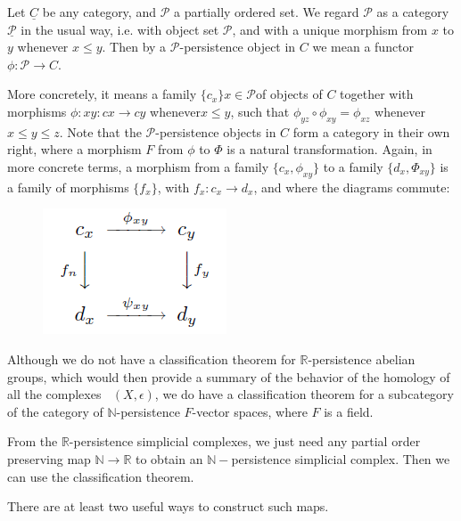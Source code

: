 \documentclass[11pt,reqno,oneside,a4paper]{article}
\DeclareMathOperator{\Cech}{\check{C}}
\begin{document}
\begin{defn}
	Let $\underline{C}$ be any category, and $\mathcal{P}$ a partially ordered set. We regard $\mathcal{P}$
	as a category $\underline{\mathcal{P}}$ in the usual way, i.e. with object set $\mathcal{P}$, and with a unique morphism	from $x$ to $y$ whenever $x \leq y$. Then by a $\mathcal{P}$-persistence object in $C$ we mean a functor
	$\phi : \mathcal{P} \to C$.
	
	 More concretely, it means a family $\{c_x\}{x\in \mathcal{P}} $of objects of $C$ together with morphisms $\phi: xy : cx \to cy$ whenever$ x \leq y$, such that $\phi_{yz} \circ \phi_{xy} = \phi_{xz}$ whenever $x \leq y \leq z$. Note that the $\mathcal{P}$-persistence objects in $C$ form a category in their own	right, where a morphism $F$ from $\phi$ to $\Phi$ is a natural transformation. Again, in
	more concrete terms, a morphism from a family $\{c_x, \phi_{xy}\}$ to a family $\{d_x, \Phi_{xy}\}$ is a family of morphisms $\{f_x\}$, with $f_x : c_x \to d_x$, and where the diagrams commute:
	\begin{figure}[H]
		\centering
		\includegraphics[width=0.3\linewidth]{gfx/tda5-1}
		\label{fig:tda5-1}
	\end{figure}
\end{defn}

Although we do not have a classification theorem for $\mathbb{R}$-persistence abelian groups, which would then provide a summary of the behavior of the homology of all the complexes $\Cech(X,\epsilon)$, we do have a classification theorem for a subcategory of the category of $\mathbb{N}$-persistence $F$-vector spaces, where $F$ is a field. 

From the $\mathbb{R}$-persistence simplicial complexes, we just need any partial order preserving map $\mathbb{N} \to \mathbb{R}$ to obtain an $\mathbb{N}-$persistence simplicial complex. Then we can use the classification theorem. 

There are at least two useful ways to construct such maps. 
\end{document}
